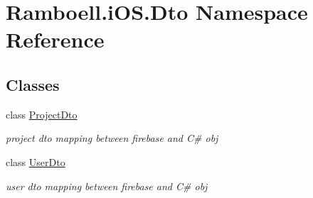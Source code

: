 \hypertarget{namespace_ramboell_1_1i_o_s_1_1_dto}{}\section{Ramboell.\+i\+O\+S.\+Dto Namespace Reference}
\label{namespace_ramboell_1_1i_o_s_1_1_dto}
\subsection*{Classes}
\begin{DoxyCompactItemize}
\item 
class \hyperlink{class_ramboell_1_1i_o_s_1_1_dto_1_1_project_dto}{Project\+Dto}
\begin{DoxyCompactList}\small\item\em project dto mapping between firebase and C\# obj \end{DoxyCompactList}\item 
class \hyperlink{class_ramboell_1_1i_o_s_1_1_dto_1_1_user_dto}{User\+Dto}
\begin{DoxyCompactList}\small\item\em user dto mapping between firebase and C\# obj \end{DoxyCompactList}\end{DoxyCompactItemize}

